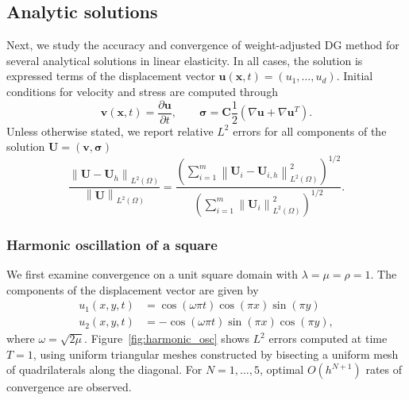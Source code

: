 \documentclass{siamart0216}
\newcommand{\pd}[2]{\frac{\partial#1}{\partial#2}}
\newcommand{\nor}[1]{\left\| #1 \right\|}
\newcommand{\LRp}[1]{\left( #1 \right)}
\newcommand{\Grad} {\ensuremath{\nabla}}
\begin{document}
\subsection{Analytic solutions} 

Next, we study the accuracy and convergence of weight-adjusted DG method for several analytical solutions in linear elasticity.  In all cases, the solution is expressed terms of the displacement vector $\bm{u}(\bm{x},t) = (u_1,\ldots,u_d)$.  Initial conditions for velocity and stress are computed through 
\[
\bm{v}(\bm{x},t) = \pd{\bm{u}}{t}, \qquad \bm{\sigma} = \bm{C}\frac{1}{2}\LRp{\Grad\bm{u} + \Grad\bm{u}^T}.  
\]
Unless otherwise stated, we report relative $L^2$ errors for all components of the solution $\bm{U} = (\bm{v},\bm{\sigma})$ 
\[
\frac{\nor{\bm{U}-\bm{U}_h}_{L^2\LRp{\Omega}}}{\nor{\bm{U}}_{L^2\LRp{\Omega}}} = \frac{\LRp{\sum_{i=1}^m \nor{\bm{U}_i-\bm{U}_{i,h}}^2_{L^2\LRp{\Omega}}}^{1/2}}{\LRp{\sum_{i=1}^m\nor{\bm{U}_i}^2_{L^2\LRp{\Omega}}}^{1/2}}.
\]

\subsubsection{Harmonic oscillation of a square} 

We first examine convergence  on a unit square domain with  $\lambda = \mu = \rho = 1$.   The components of the displacement vector are given by
\begin{align*}
u_1(x,y,t) &= \cos(\omega\pi t)\cos(\pi x)\sin(\pi y)\\
u_2(x,y,t) &= -\cos(\omega\pi t)\sin(\pi x)\cos(\pi y),
\end{align*}
where $\omega = \sqrt{2\mu}$.  Figure~\ref{fig:harmonic_osc} shows $L^2$ errors computed at time $T = 1$, using uniform triangular meshes constructed by bisecting a uniform mesh of quadrilaterals along the diagonal.  For $N = 1,\ldots, 5$, optimal $O(h^{N+1})$ rates of convergence are observed.  
\end{document}
